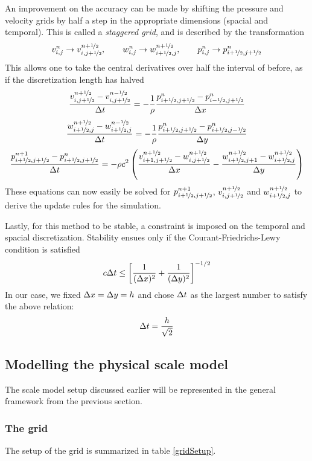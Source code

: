 An improvement on the accuracy can be made by shifting the pressure and velocity grids by half a step in the appropriate dimensions (spacial and temporal). This is called a \emph{staggered grid}\cite{staggered-grid}, and is described by the transformation
$$
v_{i,j}^n \to v_{i,j+\nicefrac{1}{2}}^{n+\nicefrac{1}{2}}
, \qquad
w_{i,j}^n \to w_{i+\nicefrac{1}{2},j}^{n+\nicefrac{1}{2}}
, \qquad
p_{i,j}^n \to p^n_{i+\nicefrac{1}{2}, j+\nicefrac{1}{2}}
$$
This allows one to take the central derivatives over half the interval of before, as if the discretization length has halved
$$
\frac{v_{i,j+\nicefrac{1}{2}}^{n+\nicefrac{1}{2}} - v_{i,j+\nicefrac{1}{2}}^{n-\nicefrac{1}{2}}}{\Delta t}
	= -\frac{1}{\rho} \frac{p^n_{i+\nicefrac{1}{2},j+\nicefrac{1}{2}} - p^n_{i-\nicefrac{1}{2},j+\nicefrac{1}{2}}}{\Delta x}
$$
$$
\frac{w_{i+\nicefrac{1}{2},j}^{n+\nicefrac{1}{2}} - w_{i+\nicefrac{1}{2},j}^{n-\nicefrac{1}{2}}}{\Delta t}
	= -\frac{1}{\rho} \frac{p^n_{i+\nicefrac{1}{2},j+\nicefrac{1}{2}} - p^n_{i+\nicefrac{1}{2},j-\nicefrac{1}{2}}}{\Delta y}
$$
$$
\frac{p_{i+\nicefrac{1}{2},j+\nicefrac{1}{2}}^{n+1} - p_{i+\nicefrac{1}{2},j+\nicefrac{1}{2}}^{n}}{\Delta t} = 
	-\rho c^2 \left(
		\frac{v_{i+1,j+\nicefrac{1}{2}}^{n+\nicefrac{1}{2}} 
			- w_{i,j+\nicefrac{1}{2}}^{n+\nicefrac{1}{2}}}{\Delta x}
		- \frac{w_{i+\nicefrac{1}{2},j+1}^{n+\nicefrac{1}{2}} 
			- w_{i+\nicefrac{1}{2},j}^{n+\nicefrac{1}{2}}}{\Delta y}
	\right)
$$
These equations can now easily be solved for $p^{n+1}_{i+\nicefrac{1}{2}, j+\nicefrac{1}{2}}$, $v_{i,j+\nicefrac{1}{2}}^{n+\nicefrac{1}{2}}$ and $w_{i+\nicefrac{1}{2},j}^{n+\nicefrac{1}{2}}$ to derive the update rules for the simulation.

Lastly, for this method to be stable, a constraint is imposed on the temporal and spacial discretization. Stability ensues only if the Courant-Friedrichs-Lewy condition is satisfied\cite{courant-friedrichs-lewy}\cite{numerical-stability-2D-FDTD}
$$
c\Delta t \leq \left[\frac{1}{(\Delta x)^2} + \frac{1}{(\Delta y)^2}\right] ^ {-1/2}
$$
In our case, we fixed $\Delta x = \Delta y = h$ and chose $\Delta t$ as the largest number to satisfy the above relation:
$$
\Delta t = \frac{h}{\sqrt{2}}
$$


\subsection{Modelling the physical scale model}
The scale model setup discussed earlier will be represented in the general framework from the previous section.

\subsubsection*{The grid}
The setup of the grid is summarized in table \ref{gridSetup}.


